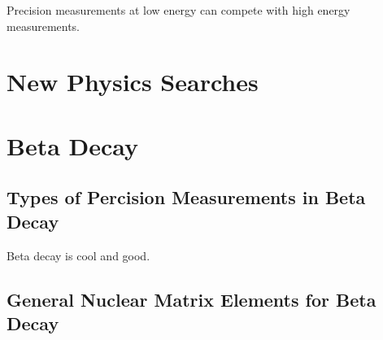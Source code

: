 \documentclass[main.tex]{subfiles}
\begin{document}
Precision measurements at low energy can compete with high energy measurements.

\section{New Physics Searches}
\section{Beta Decay}
\subsection{Types of Percision Measurements in Beta Decay}
Beta decay is cool and good.
\subsection{General Nuclear Matrix Elements for Beta Decay}
 
\end{document}
